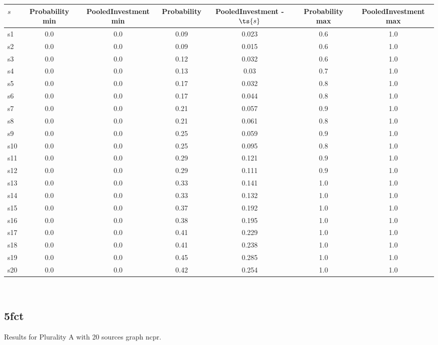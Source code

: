 \documentclass{article}
\begin{document}
\noindent\begin{tabular}{|l|c|c|c|c|c|c|}
\hline
$s$& Probability min & PooledInvestment min & Probability & PooledInvestment - $\ts{s}$ & Probability max & PooledInvestment max\\
\hline
s1 &0.0 & 0.0 & 0.09 & 0.023 & 0.6 & 1.0\\
\hline
s2 &0.0 & 0.0 & 0.09 & 0.015 & 0.6 & 1.0\\
\hline
s3 &0.0 & 0.0 & 0.12 & 0.032 & 0.6 & 1.0\\
\hline
s4 &0.0 & 0.0 & 0.13 & 0.03 & 0.7 & 1.0\\
\hline
s5 &0.0 & 0.0 & 0.17 & 0.032 & 0.8 & 1.0\\
\hline
s6 &0.0 & 0.0 & 0.17 & 0.044 & 0.8 & 1.0\\
\hline
s7 &0.0 & 0.0 & 0.21 & 0.057 & 0.9 & 1.0\\
\hline
s8 &0.0 & 0.0 & 0.21 & 0.061 & 0.8 & 1.0\\
\hline
s9 &0.0 & 0.0 & 0.25 & 0.059 & 0.9 & 1.0\\
\hline
s10 &0.0 & 0.0 & 0.25 & 0.095 & 0.8 & 1.0\\
\hline
s11 &0.0 & 0.0 & 0.29 & 0.121 & 0.9 & 1.0\\
\hline
s12 &0.0 & 0.0 & 0.29 & 0.111 & 0.9 & 1.0\\
\hline
s13 &0.0 & 0.0 & 0.33 & 0.141 & 1.0 & 1.0\\
\hline
s14 &0.0 & 0.0 & 0.33 & 0.132 & 1.0 & 1.0\\
\hline
s15 &0.0 & 0.0 & 0.37 & 0.192 & 1.0 & 1.0\\
\hline
s16 &0.0 & 0.0 & 0.38 & 0.195 & 1.0 & 1.0\\
\hline
s17 &0.0 & 0.0 & 0.41 & 0.229 & 1.0 & 1.0\\
\hline
s18 &0.0 & 0.0 & 0.41 & 0.238 & 1.0 & 1.0\\
\hline
s19 &0.0 & 0.0 & 0.45 & 0.285 & 1.0 & 1.0\\
\hline
s20 &0.0 & 0.0 & 0.42 & 0.254 & 1.0 & 1.0\\
\hline
\end{tabular}\\

\newpage

\subsection{5fct}

\noindent Results for Plurality A with 20 sources graph ncpr.
\end{document}
